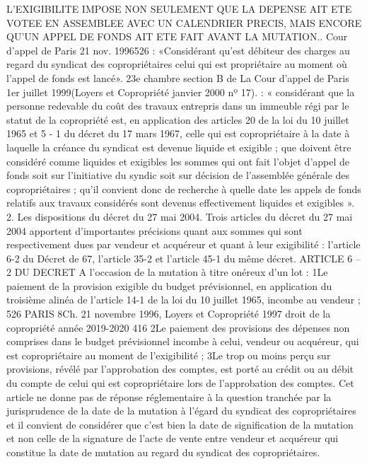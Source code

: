 L’EXIGIBILITE IMPOSE NON SEULEMENT QUE LA DEPENSE AIT ETE VOTEE EN ASSEMBLEE AVEC UN CALENDRIER PRECIS, MAIS ENCORE QU’UN APPEL DE FONDS AIT ETE FAIT AVANT LA MUTATION..
Cour d’appel de Paris 21 nov. 1996526 :
«Considérant qu’est débiteur des charges au regard du syndicat des copropriétaires celui qui est propriétaire au moment où l’appel de fonds est lancé».
23e chambre section B de La Cour d’appel de Paris 1er juillet 1999(Loyers et Copropriété janvier 2000 nº 17). :
« considérant que la personne redevable du coût des travaux entrepris dans un immeuble régi par le statut de la copropriété est, en application des articles 20 de la loi du 10 juillet 1965 et 5 - 1 du décret du 17 mars 1967, celle qui est copropriétaire à la date à laquelle la créance du syndicat est devenue liquide et exigible ; que doivent être considéré comme liquides et exigibles les sommes qui ont fait l'objet d'appel de fonds soit sur l'initiative du syndic soit sur décision de l'assemblée générale des copropriétaires ; qu'il convient donc de recherche à quelle date les appels de fonds relatifs aux travaux considérés sont devenus effectivement liquides et exigibles ».
2. Les dispositions du décret du 27 mai 2004.
Trois articles du décret du 27 mai 2004 apportent d’importantes précisions quant aux sommes qui sont respectivement dues par vendeur et acquéreur et quant à leur exigibilité : l’article 6-2 du Décret de 67, l’article 35-2 et l’article 45-1 du même décret.
ARTICLE 6 – 2 DU DECRET
A l'occasion de la mutation à titre onéreux d'un lot :
1\degres Le paiement de la provision exigible du budget prévisionnel, en application du troisième alinéa de l'article 14-1 de la loi du 10 juillet 1965, incombe au vendeur ;
526 PARIS 8\degres Ch. 21 novembre 1996, Loyers et Copropriété 1997 
droit de la copropriété année 2019-2020
416
2\degres Le paiement des provisions des dépenses non comprises dans le budget prévisionnel incombe à celui, vendeur ou acquéreur, qui est copropriétaire au moment de l'exigibilité ;
3\degres Le trop ou moins perçu sur provisions, révélé par l'approbation des comptes, est porté au crédit ou au débit du compte de celui qui est copropriétaire lors de l'approbation des comptes.
Cet article ne donne pas de réponse réglementaire à la question tranchée par la jurisprudence de la date de la mutation à l’égard du syndicat des copropriétaires et il convient de considérer que c’est bien la date de signification de la mutation et non celle de la signature de l’acte de vente entre vendeur et acquéreur qui constitue la date de mutation au regard du syndicat des copropriétaires.
